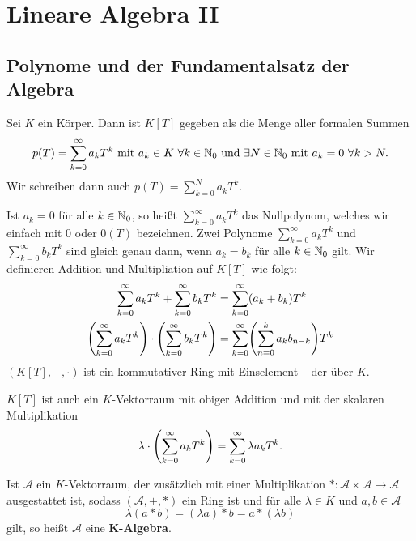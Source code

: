 \section{Lineare Algebra II} %
\label{cha:2}
\setcounter{subsection}{0}
\subsection{Polynome und der Fundamentalsatz der Algebra}
\label{sec:2.1}

\begin{erinnerung}[Polynomring]
	\label{erinnerung:1.1}
	Sei $K$ ein Körper.
	Dann ist $K[T]$ gegeben als die Menge aller formalen Summen
	\[
		p(T) = \sum_{k=0}^{\infty} a_k T^k \text{ mit } a_k \in K \ \forall k \in \mathbb{N}_0 \text{ und } \exists N \in \mathbb{N}_0 \text{ mit } a_k = 0 \ \forall k > N.
	\]
	Wir schreiben dann auch $p(T) = \sum_{k=0}^{N} a_kT^k$.
	
	Ist $a_k=0$ für alle $k \in \mathbb{N}_0$, so heißt $\sum_{k=0}^{\infty} a_kT^k$ das Nullpolynom, welches wir einfach mit $0$ oder $0(T)$ bezeichnen.
	Zwei Polynome $\sum_{k=0}^{\infty} a_kT^k$ und $\sum_{k=0}^{\infty} b_kT^k$ sind gleich genau dann, wenn $a_k = b_k$ für alle $k \in \mathbb{N}_0$ gilt.
	Wir definieren Addition und Multipliation auf $K[T]$ wie folgt:
	\begin{align*}
		\sum_{k=0}^{\infty} a_kT^{k} + \sum_{k=0}^{\infty} b_kT^{k} &= \sum_{k=0}^{\infty} (a_k+b_k)T^{k} \\
		\enb{\sum_{k=0}^{\infty} a_kT^{k}} \cdot \enb{\sum_{k=0}^{\infty} b_kT^{k}} &= \sum_{k=0}^{\infty} \enb{\sum_{n=0}^{k} a_kb_{n-k}} T^{k}
	\end{align*}
	$(K[T],+,\cdot)$ ist ein kommutativer Ring mit Einselement -- der  über $K$.
	
	$K[T]$ ist auch ein $K$-Vektorraum mit obiger Addition und mit der skalaren Multiplikation
	\[
		\lambda \cdot \left(\sum_{k=0}^{\infty} a_kT^{k}\right) = \sum_{k=0}^{\infty} \lambda a_kT^{k}.
	\]
\end{erinnerung}

\begin{bemerkung}
	\label{bem:1.2}
	Ist $\mathcal{A}$ ein $K$-Vektorraum, der zusätzlich mit einer Multiplikation $*\colon \mathcal{A} \times \mathcal{A} \rightarrow \mathcal{A}$ ausgestattet ist, sodass $(\mathcal{A},+,*)$ ein Ring ist und für alle $\lambda \in K$ und $a,b\in \mathcal{A}$
	\[
		\lambda(a*b) = (\lambda a)*b = a * (\lambda b)
	\]
	gilt, so heißt $\mathcal{A}$ eine $\mathbf{K}$\textbf{-Algebra}. 
\end{bemerkung}

